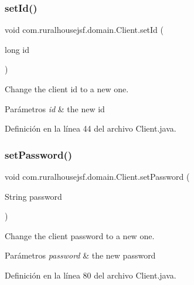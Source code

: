 \subsubsection{\texorpdfstring{setId()}{setId()}}
{\footnotesize\ttfamily void com.\+ruralhousejsf.\+domain.\+Client.\+set\+Id (\begin{DoxyParamCaption}\item[{long}]{id }\end{DoxyParamCaption})}

Change the client id to a new one.


\begin{DoxyParams}{Parámetros}
{\em id} & the new id \\
\hline
\end{DoxyParams}


Definición en la línea 44 del archivo Client.\+java.

\mbox{\label{classcom_1_1ruralhousejsf_1_1domain_1_1_client_a89d703e0377510769b326334f31fbb8d}} 
\subsubsection{\texorpdfstring{setPassword()}{setPassword()}}
{\footnotesize\ttfamily void com.\+ruralhousejsf.\+domain.\+Client.\+set\+Password (\begin{DoxyParamCaption}\item[{String}]{password }\end{DoxyParamCaption})}

Change the client password to a new one.


\begin{DoxyParams}{Parámetros}
{\em password} & the new password \\
\hline
\end{DoxyParams}


Definición en la línea 80 del archivo Client.\+java.

\mbox{\label{classcom_1_1ruralhousejsf_1_1domain_1_1_client_acf233b95ed06204b7724cc7d277352ab}} 

